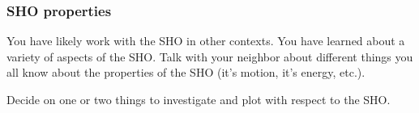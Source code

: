 \documentclass[letterpaper,10pt,english]{jupyterBook}
\begin{document}
\subsubsection{SHO properties}
\label{\detokenize{content/2_oscillations/activity-SHO_and_dynamical_systems:sho-properties}}
\sphinxAtStartPar
You have likely work with the SHO in other contexts. You have learned about a variety of aspects of the SHO. Talk with your neighbor about different things you all know about the properties of the SHO (it’s motion, it’s energy, etc.).

\sphinxAtStartPar
{}

\sphinxAtStartPar
Decide on one or two things to investigate and plot with respect to the SHO. 
\end{document}
